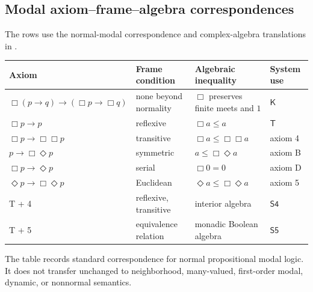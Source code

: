 \subsection{Modal axiom--frame--algebra correspondences}
\label{sec:p14-modal-correspondence}

The rows use the normal-modal correspondence and complex-algebra translations
in \cite{BlackburnDeRijkeVenema2001,Goldblatt1989}.

\begin{tabularx}{\textwidth}{@{}l l l X@{}}
\toprule
Axiom & Frame condition & Algebraic inequality & System use \\
\midrule
\(\Box(p\to q)\to(\Box p\to\Box q)\) & none beyond normality & \(\Box\) preserves finite meets and \(1\) & \(\mathsf K\) \\
\(\Box p\to p\) & reflexive & \(\Box a\le a\) & \(\mathsf T\) \\
\(\Box p\to\Box\Box p\) & transitive & \(\Box a\le\Box\Box a\) & axiom 4 \\
\(p\to\Box\Diamond p\) & symmetric & \(a\le\Box\Diamond a\) & axiom B \\
\(\Box p\to\Diamond p\) & serial & \(\Box0=0\) & axiom D \\
\(\Diamond p\to\Box\Diamond p\) & Euclidean & \(\Diamond a\le\Box\Diamond a\) & axiom 5 \\
T + 4 & reflexive, transitive & interior algebra & \(\mathsf{S4}\) \\
T + 5 & equivalence relation & monadic Boolean algebra & \(\mathsf{S5}\) \\
\bottomrule
\end{tabularx}

The table records standard correspondence for normal propositional modal
logic. It does not transfer unchanged to neighborhood, many-valued, first-order
modal, dynamic, or nonnormal semantics.
